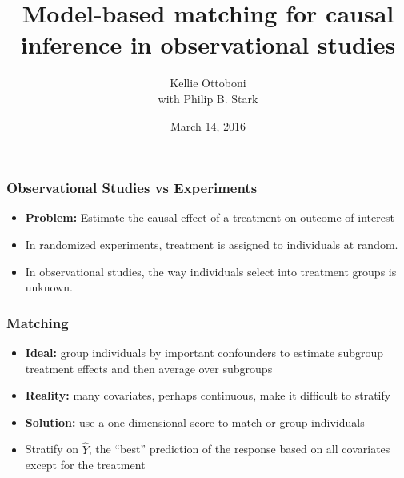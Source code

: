 \documentclass{beamer}
\title[Model-based matching]{Model-based matching for causal inference in observational studies}
\author{Kellie Ottoboni \\ with Philip B. Stark}
\institute[]{Department of Statistics, UC Berkeley}
\date{March 14, 2016}
\begin{document}
\frame{\titlepage}

\frame
{
  \frametitle{Observational Studies vs Experiments}
 \begin{center}
\begin{itemize}
\item \textbf{Problem:} Estimate the causal effect of a treatment on outcome of interest
\item In randomized experiments, treatment is assigned to individuals at random.
\item In observational studies, the way individuals select into treatment groups is unknown.
\end{itemize}

\begin{figure}[h]
\end{figure}
\end{center}
}


\frame
{
  \frametitle{Matching}
\begin{center}
\begin{itemize}
\item \textbf{Ideal:} group individuals by important confounders to estimate subgroup treatment effects and then average over subgroups
\item \textbf{Reality:} many covariates, perhaps continuous, make it difficult to stratify
\end{itemize}
\begin{itemize}
\item \textbf{Solution:} use a one-dimensional score to match or group individuals
\item  Stratify on $\hat{Y}$, the ``best'' prediction of the response based on all covariates except for the treatment
\end{itemize}

\end{center}
}
\end{document}
